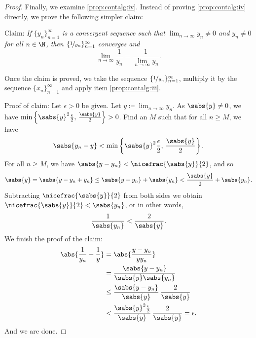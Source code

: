 \begin{proof}
Finally, we examine
\ref{prop:contalg:iv}.  Instead of proving 
\ref{prop:contalg:iv} directly, we prove the following simpler claim:

Claim: \emph{If $\{ y_n \}_{n=1}^\infty$ is a convergent sequence such that
$\lim_{n\to\infty} y_n \not= 0$ and $y_n \not= 0$ for all $n \in \N$, then
$\{ \nicefrac{1}{y_n} \}_{n=1}^\infty$ converges and}
\begin{equation*}
\lim_{n\to\infty} \frac{1}{y_n} = \frac{1}{\lim_{n\to\infty} y_n}  .
\end{equation*}

Once the claim is proved, we take the sequence
$\{ \nicefrac{1}{y_n} \}_{n=1}^\infty$,
multiply it by the sequence $\{ x_n \}_{n=1}^\infty$ and apply item
\ref{prop:contalg:iii}.

Proof of claim:  Let $\epsilon > 0$ be given.
Let $y \coloneqq \lim_{n\to\infty} y_n$.
As $\sabs{y} \not= 0$, we have
$\min \left\{ \sabs{y}^2\frac{\epsilon}{2}, \, \frac{\sabs{y}}{2} \right\} > 0$.
Find an $M$ such that for all $n \geq M$,
we have
\begin{equation*}
\sabs{y_n - y} < \min \left\{ \sabs{y}^2\frac{\epsilon}{2}, \, \frac{\sabs{y}}{2}
\right\} .
\end{equation*}
For all $n \geq M$, we have
$\sabs{y - y_n} < \nicefrac{\sabs{y}}{2}$, and so
\begin{equation*}
\sabs{y} = 
\sabs{y - y_n + y_n } \leq
\sabs{y - y_n} + \sabs{ y_n } < \frac{\sabs{y}}{2} + \sabs{y_n}.
\end{equation*}
Subtracting $\nicefrac{\sabs{y}}{2}$ from both sides we obtain
$\nicefrac{\sabs{y}}{2} < \sabs{y_n}$, or in other words,
\begin{equation*}
\frac{1}{\sabs{y_n}} < \frac{2}{\sabs{y}} .
\end{equation*}
We finish the proof of the claim:
\begin{equation*}
\begin{split}
\abs{\frac{1}{y_n} - \frac{1}{y}} &=
\abs{\frac{y - y_n}{y y_n}} \\
& =
\frac{\sabs{y - y_n}}{\sabs{y} \sabs{y_n}} \\
& \leq
\frac{\sabs{y - y_n}}{\sabs{y}} \, \frac{2}{\sabs{y}} \\
& <
\frac{\sabs{y}^2 \frac{\epsilon}{2}}{\sabs{y}} \, \frac{2}{\sabs{y}}
= \epsilon .
\end{split}
\end{equation*}
And we are done.
\end{proof}

